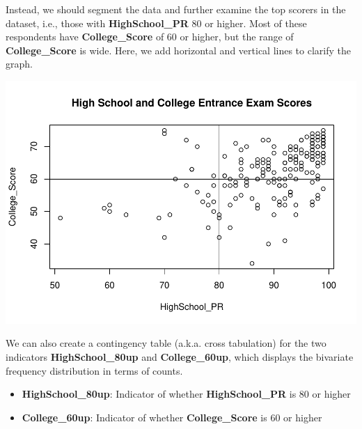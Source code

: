 \documentclass[
]{article}
\newenvironment{Shaded}{\begin{snugshade}}{\end{snugshade}}
\newcommand{\AttributeTok}[1]{\textcolor[rgb]{0.77,0.63,0.00}{#1}}
\newcommand{\DecValTok}[1]{\textcolor[rgb]{0.00,0.00,0.81}{#1}}
\newcommand{\FunctionTok}[1]{\textcolor[rgb]{0.00,0.00,0.00}{#1}}
\newcommand{\NormalTok}[1]{#1}
\newcommand{\SpecialCharTok}[1]{\textcolor[rgb]{0.00,0.00,0.00}{#1}}
\newcommand{\StringTok}[1]{\textcolor[rgb]{0.31,0.60,0.02}{#1}}
\providecommand{\tightlist}{%
  \setlength{\itemsep}{0pt}\setlength{\parskip}{0pt}}
\begin{document}
Instead, we should segment the data and further examine the top scorers
in the dataset, i.e., those with \textbf{HighSchool\_PR} 80 or higher.
Most of these respondents have \textbf{College\_Score} of 60 or higher,
but the range of \textbf{College\_Score} is wide. Here, we add
horizontal and vertical lines to clarify the graph.

\begin{Shaded}
\end{Shaded}

\includegraphics{PTT_Analysis_of_Test_Scores_Unfinished_files/figure-latex/high-scorer-obs-1.pdf}

We can also create a contingency table (a.k.a. cross tabulation) for the
two indicators \textbf{HighSchool\_80up} and \textbf{College\_60up},
which displays the bivariate frequency distribution in terms of counts.

\begin{itemize}
\tightlist
\item
  \textbf{HighSchool\_80up}: Indicator of whether
  \textbf{HighSchool\_PR} is 80 or higher
\item
  \textbf{College\_60up}: Indicator of whether \textbf{College\_Score}
  is 60 or higher
\end{itemize}
\end{document}
